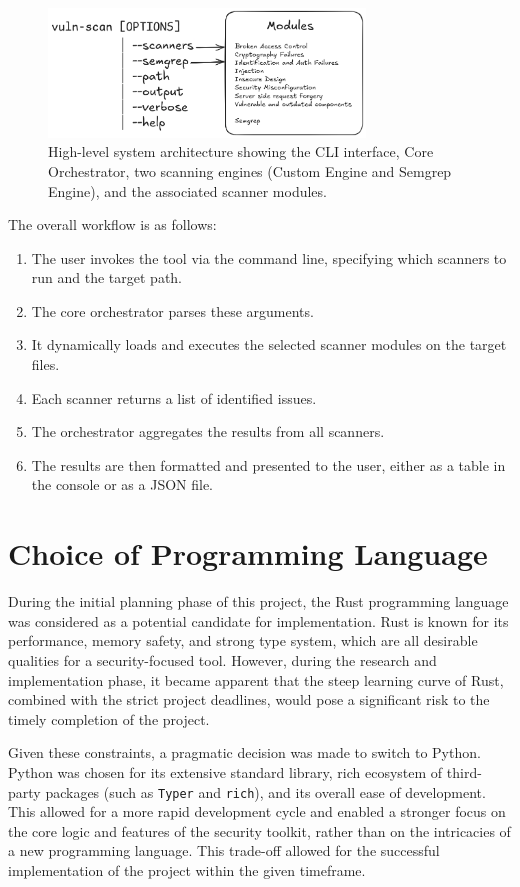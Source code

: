 \begin{figure}[h!]
\centering
\includegraphics[width=0.75\textwidth]{images/CLI-Diagram.png}
\caption{High-level system architecture showing the CLI interface, Core Orchestrator, two scanning engines (Custom Engine and Semgrep Engine), and the associated scanner modules.}
\label{fig:system_architecture}
\end{figure}

The overall workflow is as follows:
\begin{enumerate}
    \item The user invokes the tool via the command line, specifying which scanners to run and the target path.
    \item The core orchestrator parses these arguments.
    \item It dynamically loads and executes the selected scanner modules on the target files.
    \item Each scanner returns a list of identified issues.
    \item The orchestrator aggregates the results from all scanners.
    \item The results are then formatted and presented to the user, either as a table in the console or as a JSON file.
\end{enumerate}

\section{Choice of Programming Language}

During the initial planning phase of this project, the Rust programming language was considered as a potential candidate for implementation. Rust is known for its performance, memory safety, and strong type system, which are all desirable qualities for a security-focused tool. However, during the research and implementation phase, it became apparent that the steep learning curve of Rust, combined with the strict project deadlines, would pose a significant risk to the timely completion of the project.

Given these constraints, a pragmatic decision was made to switch to Python. Python was chosen for its extensive standard library, rich ecosystem of third-party packages (such as \texttt{Typer} and \texttt{rich}), and its overall ease of development. This allowed for a more rapid development cycle and enabled a stronger focus on the core logic and features of the security toolkit, rather than on the intricacies of a new programming language. This trade-off allowed for the successful implementation of the project within the given timeframe.

